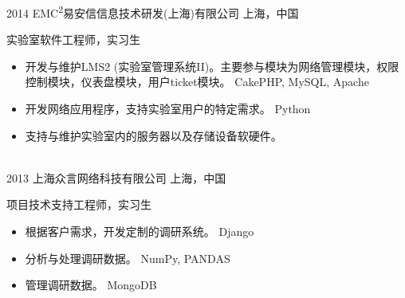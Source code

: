 \documentclass[]{friggeri-cv-cn} %
\begin{document}
\begin{entrylist}
\entry
{2014}
{EMC\textsuperscript{2}易安信信息技术研发(上海)有限公司}
{上海，中国}
{实验室软件工程师，实习生
\begin{itemize}
\item 开发与维护LMS2 (实验室管理系统II)。主要参与模块为网络管理模块，权限控制模块，仪表盘模块，用户ticket模块。 {\footnotesize{} CakePHP, MySQL, Apache}
\item 开发网络应用程序，支持实验室用户的特定需求。{\footnotesize{} Python}
\item 支持与维护实验室内的服务器以及存储设备软硬件。
\end{itemize}
}
\\
\entry
{2013}
{上海众言网络科技有限公司}
{上海，中国}
{项目技术支持工程师，实习生
\begin{itemize}
\item 根据客户需求，开发定制的调研系统。{\footnotesize{} Django}
\item 分析与处理调研数据。{\footnotesize{} NumPy, PANDAS}
\item 管理调研数据。{\footnotesize{} MongoDB}
\end{itemize}
}
\end{entrylist}


%
\end{document}
